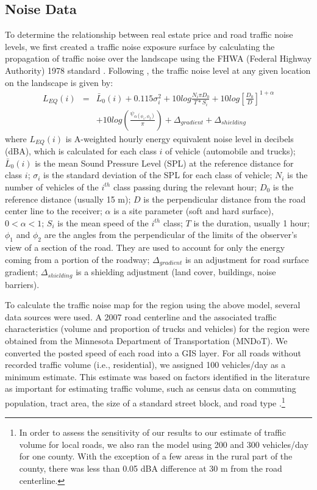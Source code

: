 \documentclass{article}\usepackage[]{graphicx}\usepackage[]{color}
\begin{document}
\subsection{Noise Data}
To determine the relationship between real estate price and road traffic noise levels, we first created a traffic noise exposure surface by calculating the propagation of traffic noise over the landscape using the FHWA (Federal Highway Authority) 1978 standard \citep{Barry1978}. Following \citet{Barry1978}, the traffic noise level at any given location on the landscape is given by: 
\begin{eqnarray}\label{eq:noise}
L_{EQ}(i) &=& \bar{L}_0(i) + 0.115 \sigma _i^2 + 10 log \frac{N_i \pi D_0}{T*S_i} + 10 log \left[ \frac{D_0}{D}\right]^{1 + \alpha}  \nonumber \\
&& + 10 log \left( \frac{\psi _{\alpha (\phi _1, \phi _2)}}{\pi}\right) + \Delta _{gradient} + \Delta _{shielding}
\end{eqnarray}
where $L_{EQ}(i)$ is A-weighted hourly energy equivalent noise level in decibels (dBA), which is calculated for each class $i$ of vehicle (automobile and trucks); $\bar{L}_0(i)$ is the mean Sound Pressure Level (SPL) at the reference distance for class $i$; $\sigma _i$ is the standard deviation of the SPL for each class of vehicle; $N_i$ is the number of vehicles of the $i^{th}$ class passing during the relevant hour; $D_0$ is the reference distance (usually 15 m); $D$ is the perpendicular distance from the road center line to the receiver; $\alpha$ is a site parameter (soft and hard surface), $0 < \alpha < 1$; $S_i$ is the mean speed of the $i^{th}$ class; $T$ is the duration, usually 1 hour; $\phi _1$ and $\phi _2$ are the angles from the perpendicular of the limits of the observer's view of a section of the road. They are used to account for only the energy coming from a portion of the roadway; $\Delta _{gradient}$ is an adjustment for road surface gradient; $\Delta _{shielding}$ is a shielding adjustment (land cover, buildings, noise barriers).

To calculate the traffic noise map for the region using the above model, several data sources were used. A 2007 road centerline and the associated traffic characteristics (volume and proportion of trucks and vehicles) for the region were obtained from the Minnesota Department of Transportation (MNDoT). We converted the posted speed of each road into a GIS layer. For all roads without recorded traffic volume (i.e., residential), we assigned 100 vehicles/day as a minimum estimate. This estimate was based on factors identified in the literature as important for estimating traffic volume, such as census data on commuting population, tract area, the size of a standard street block, and road type \citep{Cheng1992, Fricker1986}.\footnote{In order to assess the sensitivity of our results to our estimate of traffic volume for local roads, we also ran the model using 200 and 300 vehicles/day for one county. With the exception of a few areas in the rural part of the county, there was less than 0.05 dBA difference at 30 m from the road centerline.}
\end{document}

